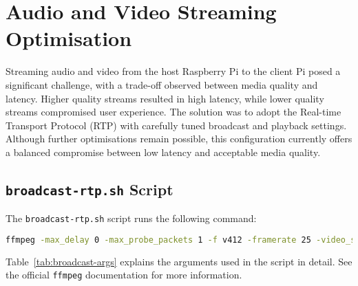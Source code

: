 \section{Audio and Video Streaming Optimisation}
Streaming audio and video from the host Raspberry Pi to the client Pi posed a
significant challenge, with a trade-off observed between media quality and
latency. Higher quality streams resulted in high latency, while lower quality
streams compromised user experience. The solution was to adopt the Real-time
Transport Protocol (RTP) with carefully tuned broadcast and playback settings.
Although further optimisations remain possible, this configuration currently
offers a balanced compromise between low latency and acceptable media quality.

\subsection{\texttt{broadcast-rtp.sh} Script}

The \texttt{broadcast-rtp.sh} script runs the following command:

\begin{lstlisting}[language=bash]
  ffmpeg -max_delay 0 -max_probe_packets 1 -f v412 -framerate 25 -video_size 720x576 -threads 1 -i /dev/video0 -vcodec libx264 -pix_fmt:v yuv420p -g:v 1 -preset ultrafast -tune zerolatency -crf 17 -max_delay 0 -fflags +nobuffer -flags low_delay -f rtp -muxdelay 0 rtp://192.168.20.20:42423
\end{lstlisting}

Table~\ref{tab:broadcast-args} explains the arguments used in the script in detail. See the official \texttt{ffmpeg} documentation for more information\cite{ffmpegDocumentation}.

